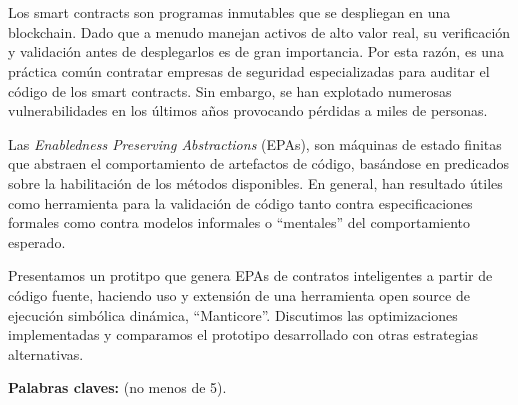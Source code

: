 \chapter*{\runtitulo}

\noindent Los smart contracts son programas inmutables que se despliegan en una blockchain. 
Dado que a menudo manejan activos de alto valor real, su verificación y validación antes de desplegarlos es de gran importancia. 
Por esta razón, es una práctica común contratar empresas de seguridad especializadas para auditar el código de los smart contracts. 
Sin embargo, se han explotado numerosas vulnerabilidades en los últimos años provocando pérdidas a miles de personas. 

Las \textit{Enabledness Preserving Abstractions} (EPAs), son máquinas de estado finitas que abstraen el comportamiento de artefactos de código, basándose en predicados sobre la habilitación de los métodos disponibles.
En general, han resultado útiles como herramienta para la validación de código tanto contra especificaciones formales como contra modelos informales o ``mentales'' del comportamiento esperado.

Presentamos un protitpo que genera EPAs de contratos inteligentes a partir de código fuente, haciendo uso y extensión de una herramienta open source de ejecución simbólica dinámica, ``Manticore''.
Discutimos las optimizaciones implementadas y comparamos el prototipo desarrollado con otras estrategias alternativas.

\bigskip

\noindent\textbf{Palabras claves:}  (no menos de 5).